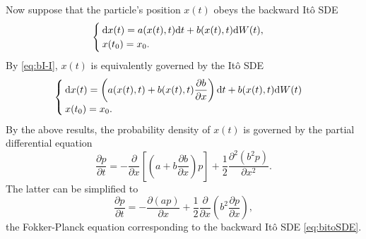 Now suppose that the particle's position $x(t)$ obeys the backward Itô SDE
\begin{equation} \label{eq:bitoSDE}
	\begin{cases}
		\rm dx(t) = a(x(t),t) \rm dt + b(x(t),t) \rm dW(t),\\
		x(t_0) = x_0. 
	\end{cases}
\end{equation}
By \eqref{eq:bI-I}, $x(t)$ is equivalently governed by the Itô SDE
\begin{equation} \label{eq:biSDE-i}
	\begin{cases}
		\rm dx(t) = \left(a(x(t),t)+b(x(t),t)\dfrac{\partial b}{\partial x}\right)\rm dt + b(x(t),t) \rm dW(t)\\
		x(t_0) = x_0. 
	\end{cases}
\end{equation}
By the above results, the probability density of $x(t)$ is governed by the partial differential equation
\begin{equation}
	\frac{\partial p}{\partial t} = - \frac{\partial}{\partial x}\left[\left(a+b\dfrac{\partial b}{\partial x}\right)p\right] + \frac{1}{2}\frac{\partial^2 (b^2 p)}{\partial x^2}.
\end{equation}
The latter can be simplified to
\begin{equation}
	\frac{\partial p}{\partial t} = - \frac{\partial(ap)}{\partial x} + \frac{1}{2}\frac{\partial}{\partial x}\left(b^2 \frac{\partial p}{\partial x} \right),
\end{equation}
the Fokker-Planck equation corresponding to the backward Itô SDE \eqref{eq:bitoSDE}.

